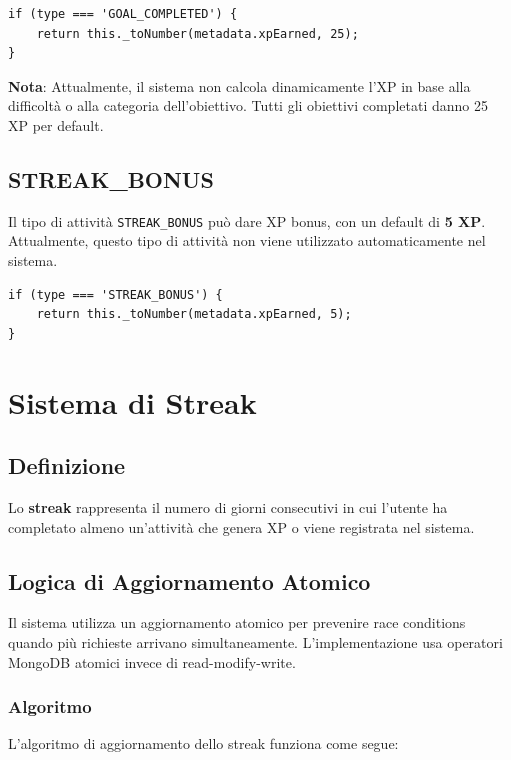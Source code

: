 \documentclass[11pt,a4paper]{article}
\begin{document}
\begin{lstlisting}
if (type === 'GOAL_COMPLETED') {
    return this._toNumber(metadata.xpEarned, 25);
}
\end{lstlisting}

\textbf{Nota}: Attualmente, il sistema non calcola dinamicamente l'XP in base alla difficoltà o alla categoria dell'obiettivo. Tutti gli obiettivi completati danno 25 XP per default.

\subsection{STREAK\_BONUS}

Il tipo di attività \texttt{STREAK\_BONUS} può dare XP bonus, con un default di \textbf{5 XP}. Attualmente, questo tipo di attività non viene utilizzato automaticamente nel sistema.

\begin{lstlisting}
if (type === 'STREAK_BONUS') {
    return this._toNumber(metadata.xpEarned, 5);
}
\end{lstlisting}

\section{Sistema di Streak}

\subsection{Definizione}

Lo \textbf{streak} rappresenta il numero di giorni consecutivi in cui l'utente ha completato almeno un'attività che genera XP o viene registrata nel sistema.

\subsection{Logica di Aggiornamento Atomico}

Il sistema utilizza un aggiornamento atomico per prevenire race conditions quando più richieste arrivano simultaneamente. L'implementazione usa operatori MongoDB atomici invece di read-modify-write.

\subsubsection{Algoritmo}

L'algoritmo di aggiornamento dello streak funziona come segue:
\end{document}

